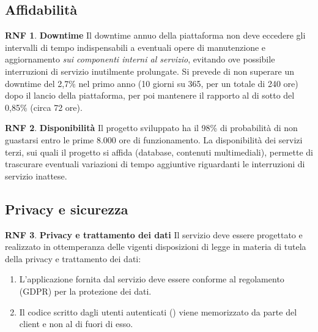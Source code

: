 \documentclass[11pt, a4paper]{article}
\theoremstyle{definition}
\newtheorem{nonfuncreq}{RNF} %
\begin{document}
\subsection{Affidabilità}

\begin{nonfuncreq}
\label{downtime}
\textbf{Downtime }
Il downtime annuo della piattaforma non deve eccedere gli intervalli di
tempo indispensabili a eventuali opere di manutenzione e aggiornamento
\textit{sui componenti interni al servizio}, evitando ove possibile
interruzioni di servizio inutilmente prolungate. Si prevede di non superare
un downtime del 2,7\% nel primo anno (10 giorni su 365, per un totale di 240
ore) dopo il lancio della piattaforma, per poi mantenere il rapporto al di
sotto del 0,85\% (circa 72 ore).
\end{nonfuncreq}

\begin{nonfuncreq}
\textbf{Disponibilità }
\label{disponibilita}
Il progetto sviluppato ha il 98\% di probabilità di non guastarsi entro le
prime 8.000 ore di funzionamento. La disponibilità dei servizi terzi, sui
quali il progetto si affida (database, contenuti multimediali), permette di
trascurare eventuali variazioni di tempo aggiuntive riguardanti le
interruzioni di servizio inattese.
\end{nonfuncreq}

\subsection{Privacy e sicurezza}

\begin{nonfuncreq}
\textbf{Privacy e trattamento dei dati }
Il servizio deve essere progettato e realizzato in ottemperanza delle
vigenti disposizioni di legge in materia di tutela della privacy e
trattamento dei dati:
\begin{enumerate}
    \item L'applicazione fornita dal servizio deve essere conforme
    al regolamento \href{https://www.garanteprivacy.it/documents/10160/0/Regolamento+UE+2016+679.+Arricchito+con+riferimenti+ai+Considerando+Aggiornato+alle+rettifiche+pubblicate+sulla+Gazzetta+Ufficiale++dell%27Unione+europea+127+del+23+maggio+2018}{\textcolor{blue}{\underbar{UE n.2016/679}}}
    (GDPR) per la protezione dei dati.

    \item Il codice scritto dagli utenti autenticati (\textcolor{blue}{})
    viene memorizzato da parte del client e non al di fuori di esso.
\end{enumerate}
\end{nonfuncreq}
\end{document}
